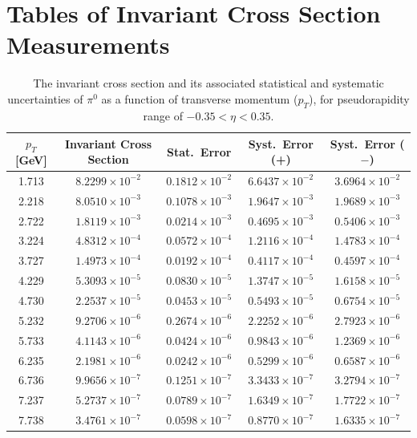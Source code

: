 \chapter{Tables of Invariant Cross Section Measurements}

\begin{table}[htbp]
\centering
\normalsize
\setlength{\tabcolsep}{5pt}

\caption{The invariant cross section and its associated statistical and systematic uncertainties of $\pi^0$ as a function of transverse momentum ($p_T$), for pseudorapidity range of $-0.35 < \eta < 0.35$.}
\label{tab:inv_cross_section_pi0_PH}

\begin{tabular}{ccccc}
\hline
$p_T$ [GeV] &
Invariant Cross Section &
Stat.\ Error &
Syst.\ Error (+) &
Syst.\ Error ($-$) \\
\hline

1.713  & $8.2299\times10^{-2}$ & $0.1812\times10^{-2}$ & $6.6437\times10^{-2}$ & $3.6964\times10^{-2}$ \\
2.218  & $8.0510\times10^{-3}$ & $0.1078\times10^{-3}$ & $1.9647\times10^{-3}$ & $1.9689\times10^{-3}$ \\
2.722  & $1.8119\times10^{-3}$ & $0.0214\times10^{-3}$ & $0.4695\times10^{-3}$ & $0.5406\times10^{-3}$ \\
3.224  & $4.8312\times10^{-4}$ & $0.0572\times10^{-4}$ & $1.2116\times10^{-4}$ & $1.4783\times10^{-4}$ \\
3.727  & $1.4973\times10^{-4}$ & $0.0192\times10^{-4}$ & $0.4117\times10^{-4}$ & $0.4597\times10^{-4}$ \\
4.229  & $5.3093\times10^{-5}$ & $0.0830\times10^{-5}$ & $1.3747\times10^{-5}$ & $1.6158\times10^{-5}$ \\
4.730  & $2.2537\times10^{-5}$ & $0.0453\times10^{-5}$ & $0.5493\times10^{-5}$ & $0.6754\times10^{-5}$ \\
5.232  & $9.2706\times10^{-6}$ & $0.2674\times10^{-6}$ & $2.2252\times10^{-6}$ & $2.7923\times10^{-6}$ \\
5.733  & $4.1143\times10^{-6}$ & $0.0424\times10^{-6}$ & $0.9843\times10^{-6}$ & $1.2369\times10^{-6}$ \\
6.235  & $2.1981\times10^{-6}$ & $0.0242\times10^{-6}$ & $0.5299\times10^{-6}$ & $0.6587\times10^{-6}$ \\
6.736  & $9.9656\times10^{-7}$ & $0.1251\times10^{-7}$ & $3.3433\times10^{-7}$ & $3.2794\times10^{-7}$ \\
7.237  & $5.2737\times10^{-7}$ & $0.0789\times10^{-7}$ & $1.6349\times10^{-7}$ & $1.7722\times10^{-7}$ \\
7.738  & $3.4761\times10^{-7}$ & $0.0598\times10^{-7}$ & $0.8770\times10^{-7}$ & $1.6335\times10^{-7}$ \\

\hline
\end{tabular}
\end{table}

